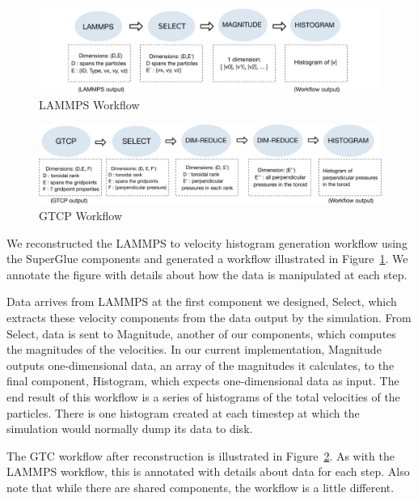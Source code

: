\documentclass[conference]{IEEEtran}
\begin{document}
\begin{figure}
  \includegraphics[width=\linewidth]{fig/wflow3}
  \caption{LAMMPS Workflow}
  \label{fig:lammps-workflow}
\end{figure}

\begin{figure}
  \includegraphics[width=\linewidth]{fig/wflow4}
  \caption{GTCP Workflow}
  \label{fig:gtcp-workflow}
\end{figure}


We reconstructed the LAMMPS to velocity histogram generation workflow using the
SuperGlue components and generated a workflow illustrated in
Figure~\ref{fig:lammps-workflow}. We annotate the figure with details about how
the data is manipulated at each step.



Data arrives from LAMMPS at the first component we designed, Select, which
extracts these velocity components from the data output by the simulation. From
Select, data is sent to Magnitude, another of our components, which computes
the magnitudes of the velocities. In our current implementation, Magnitude
outputs one-dimensional data, an array of the magnitudes it calculates, to the
final component, Histogram, which expects one-dimensional data as input. The
end result of this workflow is a series of histograms of the total velocities
of the particles. There is one histogram created at each timestep at which the
simulation would normally dump its data to disk.



The GTC workflow after reconstruction is illustrated in
Figure~\ref{fig:gtcp-workflow}. As with the LAMMPS workflow, this is annotated
with details about data for each step. Also note that while there are shared
components, the workflow is a little different.
\end{document}
